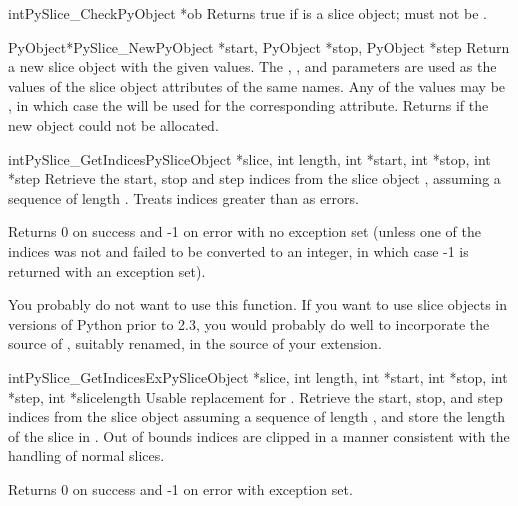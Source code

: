 \begin{cfuncdesc}{int}{PySlice_Check}{PyObject *ob}
  Returns true if  is a slice object;  must not be
  \NULL{}.
\end{cfuncdesc}

\begin{cfuncdesc}{PyObject*}{PySlice_New}{PyObject *start, PyObject *stop,
                                          PyObject *step}
  Return a new slice object with the given values.  The ,
  , and  parameters are used as the values of the
  slice object attributes of the same names.  Any of the values may be
  \NULL{}, in which case the  will be used for the
  corresponding attribute.  Returns \NULL{} if the new object could
  not be allocated.
\end{cfuncdesc}

\begin{cfuncdesc}{int}{PySlice_GetIndices}{PySliceObject *slice, int length,
                                           int *start, int *stop, int *step}
Retrieve the start, stop and step indices from the slice object
, assuming a sequence of length . Treats
indices greater than  as errors.

Returns 0 on success and -1 on error with no exception set (unless one
of the indices was not  and failed to be converted to
an integer, in which case -1 is returned with an exception set).

You probably do not want to use this function.  If you want to use
slice objects in versions of Python prior to 2.3, you would probably
do well to incorporate the source of ,
suitably renamed, in the source of your extension.
\end{cfuncdesc}

\begin{cfuncdesc}{int}{PySlice_GetIndicesEx}{PySliceObject *slice, int length,
                                             int *start, int *stop, int *step,
                                             int *slicelength}
Usable replacement for .  Retrieve the
start, stop, and step indices from the slice object 
assuming a sequence of length , and store the length of
the slice in .  Out of bounds indices are clipped in
a manner consistent with the handling of normal slices.

Returns 0 on success and -1 on error with exception set.

\end{cfuncdesc}



